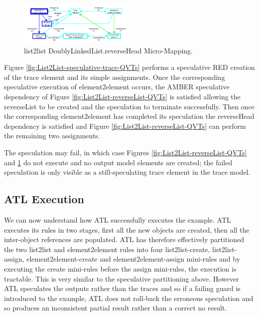 \documentclass[conference]{IEEEtran}
\begin{document}
\begin{figure}[h]
	\centering
	\includegraphics[width=0.5\textwidth]{List2List-reverseHead-QVTs.png}
	\caption{list2list DoublyLinkedList.reverseHead Micro-Mapping.}
	\label{fig:List2List-reverseHead-QVTs}
\end{figure}

Figure \ref{fig:List2List-speculative-trace-QVTs} performs a speculative RED creation of the trace element and its simple assignments. Once the corresponding speculative execution of element2element occurs, the AMBER speculative dependency of Figure \ref{fig:List2List-reverseList-QVTs} is satisfied allowing the reverseList to be created and the speculation to terminate successfully. Then once the corresponding element2element has completed its speculation the reverseHead dependency is satisfied and Figure \ref{fig:List2List-reverseList-QVTs} can perform the remaining two assignments.

The speculation may fail, in which case Figures \ref{fig:List2List-reverseList-QVTs} and \ref{fig:List2List-reverseHead-QVTs} do not execute and no output model elements are created; the failed speculation is only visible as a still-speculating trace element in the trace model.

\subsection{ATL Execution}\label{ATL Execution}

We can now understand how ATL successfully executes the example. ATL executes its rules in two stages, first all the new objects are created, then all the inter-object references are populated. ATL has therefore effectively partitioned the two list2list and element2element rules into four list2list-create, list2list-assign, element2element-create and element2element-assign mini-rules and by executing the create mini-rules before the assign mini-rules, the execution is tractable. This is very similar to the speculative partitioning above. However ATL speculates the outputs rather than the traces and so if a failing guard is introduced to the example, ATL does not roll-back the erroneous speculation and so produces an inconsistent partial result rather than a correct no result.
\end{document}
